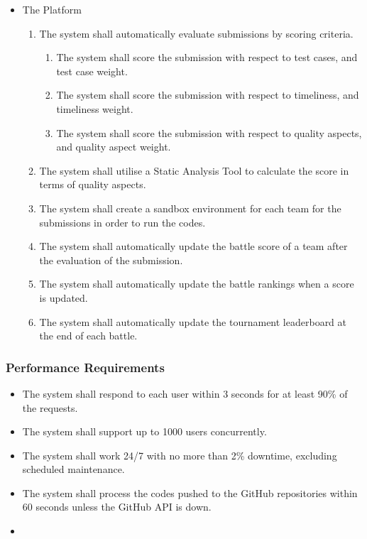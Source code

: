 \begin{itemize}
 \item The Platform
  \begin{enumerate}[resume]
     \item The system shall automatically evaluate submissions by scoring criteria.
     \begin{enumerate}
         \item The system shall score the submission with respect to test cases, and test case weight.
         \item The system shall score the submission with respect to timeliness, and timeliness weight.
         \item The system shall score the submission with respect to quality aspects, and quality aspect weight.
     \end{enumerate}
     \item The system shall utilise a Static Analysis Tool to calculate the score in terms of quality aspects.
     \item The system shall create a sandbox environment for each team for the submissions in order to run the codes.
     \item The system shall automatically update the battle score of a team after the evaluation of the submission.
     \item The system shall automatically update the battle rankings when a score is updated.
     \item The system shall automatically update the tournament leaderboard at the end of each battle.
 \end{enumerate}
 
\end{itemize}






\subsubsection{Performance Requirements}
\begin{itemize}
    \item The system shall respond to each user within 3 seconds for at least 90\% of the requests.
    \item The system shall support up to 1000 users concurrently.
    \item The system shall work 24/7 with no more than 2\% downtime, excluding scheduled maintenance.
    \item The system shall process the codes pushed to the GitHub repositories within 60 seconds unless the GitHub API is down.
    \item 
\end{itemize}




